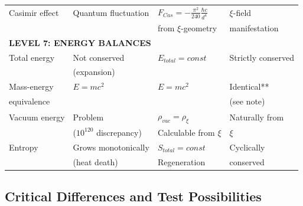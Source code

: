 \begin{table}[htbp]
{\begin{tabular}{p{3.8cm}p{2.5cm}p{3.5cm}p{2.8cm}}
	Casimir effect & Quantum fluctuation & $F_{Cas} = -\frac{\pi^2}{240} \frac{\hbar c}{d^4}$ & $\xi$-field \\
	& & from $\xi$-geometry & manifestation \\[0.3em]
	
	\midrule
	\multicolumn{4}{l}{\textbf{LEVEL 7: ENERGY BALANCES}} \\
	\midrule
	
	Total energy & Not conserved & $E_{total} = const$ & Strictly conserved \\
	& (expansion) & & \\[0.3em]
	
	Mass-energy & $E = mc^2$ & $E = mc^2$ & Identical** \\
	equivalence & & & (see note) \\[0.3em]
	
	Vacuum energy & Problem & $\rho_{vac} = \rho_\xi$ & Naturally from \\
	& ($10^{120}$ discrepancy) & Calculable from $\xi$ & $\xi$ \\[0.3em]
	
	Entropy & Grows monotonically & $S_{total} = const$ & Cyclically \\
	& (heat death) & Regeneration & conserved \\[0.3em]
	
\end{tabular}%
}
\end{table}

\normalsize

\subsection{Critical Differences and Test Possibilities}
\label{subsec:critical_differences}

\begin{table}[h]
	\centering
	\caption{Differences between $\Lambda$CDM and T0 (T0 column speculative, cf.\ P39)}
\end{table}

